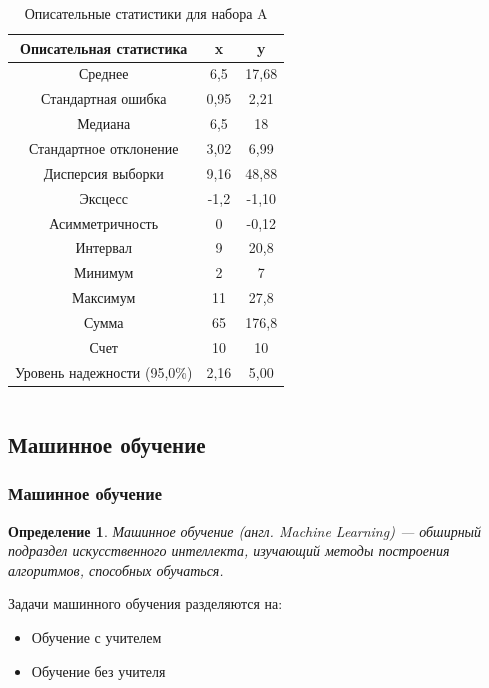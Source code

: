 \documentclass[xcolor=table]{beamer}
\newtheorem{defn}{Определение}
\begin{document}
\begin{frame}
\begin{columns}
    \begin{column}{0.7\textwidth}
      \begin{table}
        \caption{Описательные статистики для набора A}
        \begin{tabular}{|c|c|c|}
          \hline
          Описательная статистика & x & y \\ \hline
          Среднее & 6,5 & 17,68 \\ \hline
          Стандартная ошибка & 0,95 & 2,21 \\ \hline
          Медиана & 6,5 & 18 \\ \hline
          Стандартное отклонение & 3,02 & 6,99 \\ \hline
          Дисперсия выборки & 9,16 & 48,88 \\ \hline
          Эксцесс & -1,2 & -1,10 \\ \hline
          Асимметричность & 0 & -0,12 \\ \hline
          Интервал & 9 & 20,8 \\ \hline
          Минимум & 2 & 7 \\ \hline
          Максимум & 11 & 27,8 \\ \hline
          Сумма & 65 & 176,8 \\ \hline
          Счет & 10 & 10 \\ \hline
          Уровень надежности (95,0\%) & 2,16 & 5,00 \\
          \hline
        \end{tabular}
      \end{table}
    \end{column}
  \end{columns}
\end{frame}

  


\subsection{Машинное обучение}
\begin{frame}
  \frametitle{Машинное обучение}
  \begin{defn}
    Машинное обучение (англ. Machine Learning) — обширный подраздел искусственного интеллекта, изучающий методы построения алгоритмов, способных обучаться.
  \end{defn}

  \vspace{25pt}

  Задачи машинного обучения разделяются на:
  \begin{itemize}
  \item Обучение с учителем    
  \item Обучение без учителя
  \end{itemize}
\end{frame}
\end{document}
